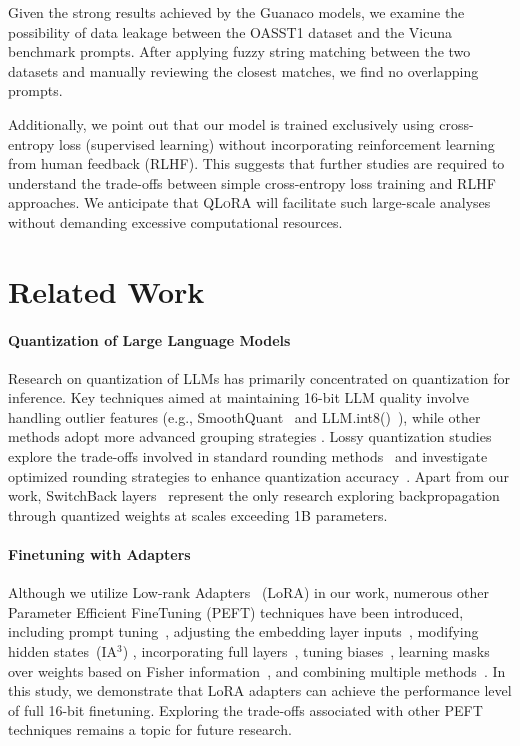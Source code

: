 Given the strong results achieved by the {Guanaco} models, we examine the possibility of data leakage between the OASST1 dataset and the Vicuna benchmark prompts. After applying fuzzy string matching between the two datasets and manually reviewing the closest matches, we find no overlapping prompts.

Additionally, we point out that our model is trained exclusively using cross-entropy loss (supervised learning) without incorporating reinforcement learning from human feedback (RLHF). This suggests that further studies are required to understand the trade-offs between simple cross-entropy loss training and RLHF approaches. We anticipate that \textsc{QLoRA} will facilitate such large-scale analyses without demanding excessive computational resources.

\section{Related Work}

\paragraph{Quantization of Large Language Models} Research on quantization of LLMs has primarily concentrated on quantization for inference. Key techniques aimed at maintaining 16-bit LLM quality involve handling outlier features (e.g., SmoothQuant~\citep{xiao2022smoothquant} and LLM.int8()~\citep{dettmers2022llm}), while other methods adopt more advanced grouping strategies \citep{park2022nuqmm, yao2022zeroquant}. Lossy quantization studies explore the trade-offs involved in standard rounding methods~\citep{dettmers2022case,zeng2022glm,pope2022efficiently} and investigate optimized rounding strategies to enhance quantization accuracy~\citep{frantar2022gptq}. Apart from our work, SwitchBack layers~\citep{wortsman2023stable} represent the only research exploring backpropagation through quantized weights at scales exceeding 1B parameters.

\paragraph{Finetuning with Adapters} Although we utilize Low-rank Adapters~\citep{hu2021lora} (LoRA) in our work, numerous other Parameter Efficient FineTuning (PEFT) techniques have been introduced, including prompt tuning~\citep{qin2021learning,lester2021power,li2021prefix}, adjusting the embedding layer inputs~\citep{an2022input}, modifying hidden states~(IA$^3$) \citep{liu2022few}, incorporating full layers~\citep{houlsby2019parameter}, tuning biases~\citep{zaken2021bitfit}, learning masks over weights based on Fisher information~\citep{sung2021training}, and combining multiple methods~\citep{henderson2021compacter}. In this study, we demonstrate that LoRA adapters can achieve the performance level of full 16-bit finetuning. Exploring the trade-offs associated with other PEFT techniques remains a topic for future research.

